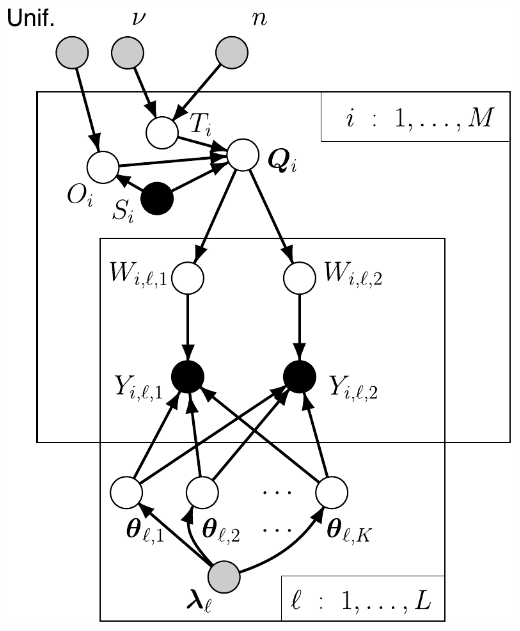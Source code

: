 

\begin{minipage}{.5\textwidth}
\vfill
\hfill\includegraphics*[width=.95\textwidth]{illus/PritchPriorPopDuo.pdf}
\end{minipage}
\hfill
